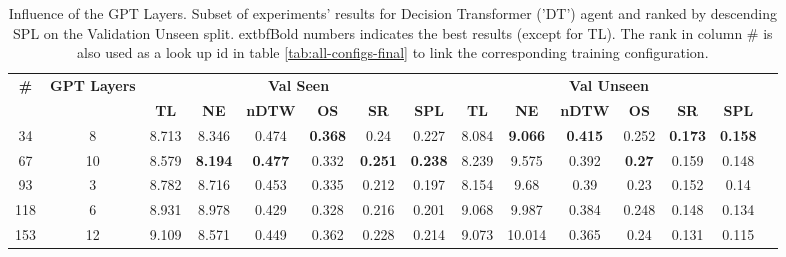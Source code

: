\begin{table}
\centering
\caption{\label{tab:dt_layers}Influence of the GPT Layers. Subset of experiments' results for Decision Transformer ('DT') agent and ranked by descending SPL on the Validation Unseen split. 	extbf{Bold} numbers indicates the best results (except for TL). The rank in column \# is also used as a look up id in table \ref{tab:all-configs-final} to link the corresponding training configuration.}
\begin{tabular}{@{\hskip3pt}c@{\hskip3pt}c@{\hskip3pt}c@{\hskip3pt}c@{\hskip3pt}c@{\hskip3pt}c@{\hskip3pt}c@{\hskip3pt}c@{\hskip3pt}c@{\hskip3pt}c@{\hskip3pt}c@{\hskip3pt}c@{\hskip3pt}c@{\hskip3pt}c@{\hskip3pt}c}
\toprule
\textbf{\#} & \textbf{GPT Layers} & \multicolumn{6}{c}{\textbf{Val Seen}} & \multicolumn{6}{c}{\textbf{Val Unseen}} \\
\cmidrule(l){3-8}\cmidrule(l){9-14}   \textbf{~} &          \textbf{~} &       \textbf{TL} &     \textbf{NE} &   \textbf{nDTW} &     \textbf{OS} &     \textbf{SR} &    \textbf{SPL} &         \textbf{TL} &     \textbf{NE} &   \textbf{nDTW} &    \textbf{OS} &     \textbf{SR} &    \textbf{SPL} \\
\midrule
         34 &                   8 &             8.713 &           8.346 &           0.474 &  \textbf{0.368} &            0.24 &           0.227 &               8.084 &  \textbf{9.066} &  \textbf{0.415} &          0.252 &  \textbf{0.173} &  \textbf{0.158} \\
         67 &                  10 &             8.579 &  \textbf{8.194} &  \textbf{0.477} &           0.332 &  \textbf{0.251} &  \textbf{0.238} &               8.239 &           9.575 &           0.392 &  \textbf{0.27} &           0.159 &           0.148 \\
         93 &                   3 &             8.782 &           8.716 &           0.453 &           0.335 &           0.212 &           0.197 &               8.154 &            9.68 &            0.39 &           0.23 &           0.152 &            0.14 \\
        118 &                   6 &             8.931 &           8.978 &           0.429 &           0.328 &           0.216 &           0.201 &               9.068 &           9.987 &           0.384 &          0.248 &           0.148 &           0.134 \\
        153 &                  12 &             9.109 &           8.571 &           0.449 &           0.362 &           0.228 &           0.214 &               9.073 &          10.014 &           0.365 &           0.24 &           0.131 &           0.115 \\
\bottomrule
\end{tabular}
\end{table}
